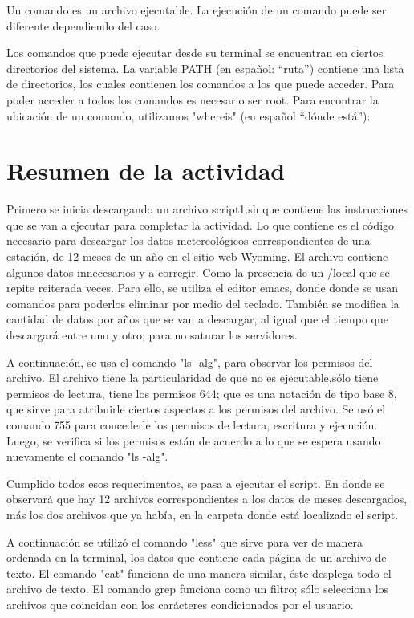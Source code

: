 \documentclass{article}
\begin{document}
Un comando es un archivo ejecutable. La ejecución de un comando puede ser diferente dependiendo del caso.

Los comandos que puede ejecutar desde su terminal se encuentran en ciertos directorios del sistema.
La variable PATH (en español: “ruta”) contiene una lista de directorios, los cuales contienen los comandos a los que puede acceder. Para poder acceder a todos los comandos es necesario ser root.
Para encontrar la ubicación de un comando, utilizamos "whereis" (en español “dónde está”):




\section{Resumen de la actividad}

Primero se inicia descargando un archivo script1.sh que contiene las instrucciones que se van a ejecutar para completar la actividad. Lo que contiene es el código necesario para descargar los datos metereológicos correspondientes de una estación, de 12 meses de un año en el sitio web Wyoming. El archivo contiene algunos datos innecesarios y a corregir. Como la presencia de un /local que se repite reiterada veces. Para ello, se utiliza el editor emacs, donde donde se usan comandos para poderlos eliminar por medio del teclado. También se modifica la cantidad de datos por años que se van a descargar, al igual que el tiempo que descargará entre uno y otro; para no saturar los servidores.

A continuación, se usa el comando "ls -alg", para observar los permisos del archivo. El archivo tiene la particularidad de que no es ejecutable,sólo tiene permisos de lectura, tiene los permisos 644; que es una notación de tipo base 8, que sirve para atribuirle ciertos aspectos a los permisos del archivo. Se usó el comando 755 para concederle los permisos de lectura, escritura y ejecución. Luego, se verifica si los permisos están de acuerdo a lo que se espera usando nuevamente el comando "ls -alg".

Cumplido todos esos requerimentos, se pasa a ejecutar el script. En donde se observará que hay 12 archivos correspondientes a los datos de meses descargados, más los dos archivos que ya había,  en la carpeta donde está localizado el script.

A continuación se utilizó el comando "less" que sirve para ver de manera ordenada en la terminal, los datos que contiene cada página de un archivo de texto. El comando "cat" funciona de una manera similar, éste desplega todo el archivo de texto. El comando grep funciona como un filtro; sólo selecciona los archivos que coincidan con los carácteres condicionados por el usuario.
\end{document}
